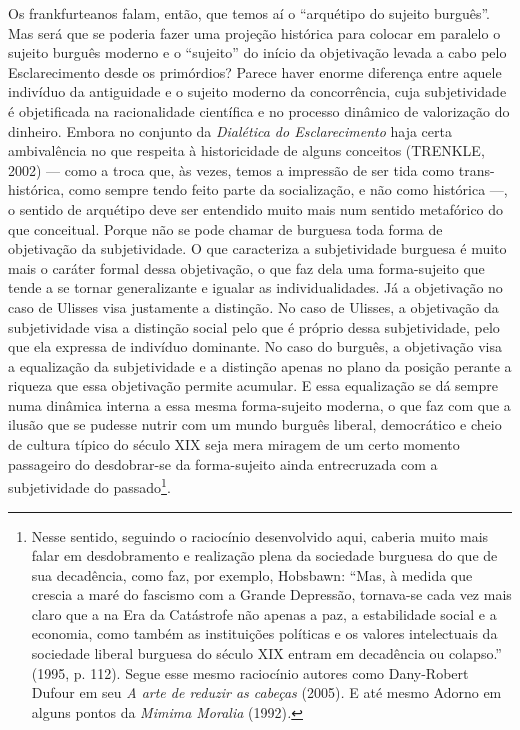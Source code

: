 Os frankfurteanos falam, então, que temos aí o ``arquétipo do sujeito
burguês''. Mas será que se poderia fazer uma projeção histórica para
colocar em paralelo o sujeito burguês moderno e o ``sujeito'' do início
da objetivação levada a cabo pelo Esclarecimento desde os primórdios?
Parece haver enorme diferença entre aquele indivíduo da antiguidade e o
sujeito moderno da concorrência, cuja subjetividade é objetificada na
racionalidade científica e no processo dinâmico de valorização do
dinheiro. Embora no conjunto da \emph{Dialética do Esclarecimento} haja
certa ambivalência no que respeita à historicidade de alguns conceitos
(TRENKLE, 2002) --- como a troca que, às vezes, temos a impressão de ser
tida como trans-histórica, como sempre tendo feito parte da
socialização, e não como histórica ---, o sentido de arquétipo deve ser
entendido muito mais num sentido metafórico do que conceitual. Porque
não se pode chamar de burguesa toda forma de objetivação da
subjetividade. O que caracteriza a subjetividade burguesa é muito mais o
caráter formal dessa objetivação, o que faz dela uma forma-sujeito que
tende a se tornar generalizante e igualar as individualidades. Já a
objetivação no caso de Ulisses visa justamente a distinção\emph{.} No
caso de Ulisses, a objetivação da subjetividade visa a distinção social
pelo que é próprio dessa subjetividade, pelo que ela expressa de
indivíduo dominante. No caso do burguês, a objetivação visa a
equalização da subjetividade e a distinção apenas no plano da posição
perante a riqueza que essa objetivação permite acumular. E essa
equalização se dá sempre numa dinâmica interna a essa mesma
forma-sujeito moderna, o que faz com que a ilusão que se pudesse nutrir
com um mundo burguês liberal, democrático e cheio de cultura típico do
século XIX seja mera miragem de um certo momento passageiro do
desdobrar-se da forma-sujeito ainda entrecruzada com a subjetividade do
passado\footnote{Nesse sentido, seguindo o raciocínio desenvolvido aqui,
  caberia muito mais falar em desdobramento e realização plena da
  sociedade burguesa do que de sua decadência, como faz, por exemplo,
  Hobsbawn: ``Mas, à medida que crescia a maré do fascismo com a Grande
  Depressão, tornava-se cada vez mais claro que a na Era da Catástrofe
  não apenas a paz, a estabilidade social e a economia, como também as
  instituições políticas e os valores intelectuais da sociedade liberal
  burguesa do século XIX entram em decadência ou colapso.'' (1995, p.
  112). Segue esse mesmo raciocínio autores como Dany-Robert Dufour em
  seu \emph{A arte de reduzir as cabeças} (2005)\emph{.} E até mesmo
  Adorno em alguns pontos da \emph{Mimima Moralia} (1992)\emph{.}}.

